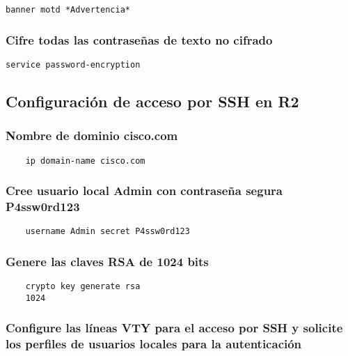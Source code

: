\documentclass[twocolumn]{article}
\begin{document}
\begin{verbatim}
banner motd *Advertencia*
\end{verbatim}

\subsubsection*{Cifre todas las contraseñas de texto no cifrado}

\begin{verbatim}
service password-encryption
\end{verbatim}

\subsection*{Configuración de acceso por SSH en R2}

\subsubsection*{
    Nombre de dominio cisco.com}

    \begin{verbatim}
    ip domain-name cisco.com
    \end{verbatim}
    
    \subsubsection*{Cree usuario local Admin con contraseña segura P4ssw0rd123}
    
    \begin{verbatim}
    username Admin secret P4ssw0rd123
    \end{verbatim}
    
    \subsubsection*{Genere las claves RSA de 1024 bits}
    
    \begin{verbatim}
    crypto key generate rsa
    1024
    \end{verbatim}
    
    \subsubsection*{Configure las líneas VTY para el acceso por SSH y solicite los perfiles de usuarios locales para la autenticación}
    
\end{document}
